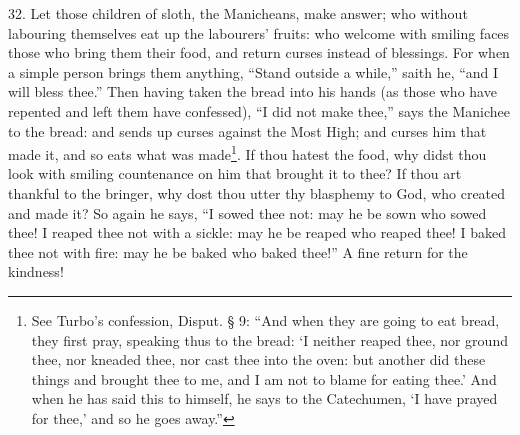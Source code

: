 32. Let those children of sloth, the Manicheans, make answer; who without labouring themselves eat up the labourers’ fruits: who welcome with smiling faces those who bring them their food, and return curses instead of blessings. For when a simple person brings them anything, “Stand outside a while,” saith he, “and I will bless thee.” Then having taken the bread into his hands (as those who have repented and left them have confessed), “I did not make thee,” says the Manichee to the bread: and sends up curses against the Most High; and curses him that made it, and so eats what was made\footnote{See Turbo’s confession, Disput. § 9: “And when they are going to eat bread, they first pray, speaking thus to the bread: ‘I neither reaped thee, nor ground thee, nor kneaded thee, nor cast thee into the oven: but another did these things and brought thee to me, and I am not to blame for eating thee.’ And when he has said this to himself, he says to the Catechumen, ‘I have prayed for thee,’ and so he goes away.”}. If thou hatest the food, why didst thou look with smiling countenance on him that brought it to thee? If thou art thankful to the bringer, why dost thou utter thy blasphemy to God, who created and made it? So again he says, “I sowed thee not: may he be sown who sowed thee! I reaped thee not with a sickle: may he be reaped who reaped thee! I baked thee not with fire: may he be baked who baked thee!” A fine return for the kindness!

